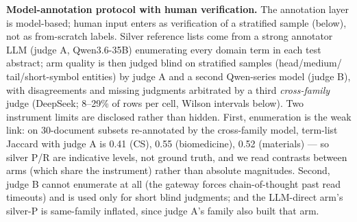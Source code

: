 \documentclass[sigconf,nonacm,anonymous]{acmart}
\begin{document}
\textbf{Model-annotation protocol with human verification.} The
annotation layer is model-based; human input enters as verification
of a stratified sample (below), not as from-scratch labels.
Silver reference lists come from a strong annotator LLM (judge A,
Qwen3.6-35B) enumerating every domain term in each test abstract; arm
quality is then judged blind on stratified samples (head/medium/
tail/short-symbol entities) by judge A and a second Qwen-series model
(judge B), with disagreements and missing judgments arbitrated by a
third \emph{cross-family} judge (DeepSeek; 8--29\% of rows per cell,
Wilson intervals below). Two instrument limits are disclosed rather
than hidden. First,
enumeration is the weak link: on 30-document subsets re-annotated by
the cross-family model, term-list Jaccard with judge A is 0.41 (CS),
0.55 (biomedicine), 0.52 (materials) --- so silver P/R are indicative
levels, not ground truth, and we read contrasts between arms (which
share the instrument) rather than absolute magnitudes. Second, judge B
cannot enumerate at all (the gateway forces chain-of-thought past read
timeouts) and is used only for short blind judgments; and the LLM-direct
arm's silver-P is same-family inflated, since judge A's family also
built that arm.
\end{document}
